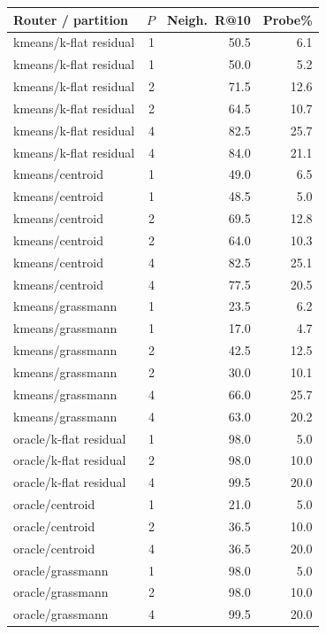 \begin{tabular}{lrrr}
\toprule
Router / partition & $P$ & Neigh.\ R@10 & Probe\% \\
\midrule
kmeans/k-flat residual & 1 & 50.5 & 6.1 \\
kmeans/k-flat residual & 1 & 50.0 & 5.2 \\
kmeans/k-flat residual & 2 & 71.5 & 12.6 \\
kmeans/k-flat residual & 2 & 64.5 & 10.7 \\
kmeans/k-flat residual & 4 & 82.5 & 25.7 \\
kmeans/k-flat residual & 4 & 84.0 & 21.1 \\
kmeans/centroid & 1 & 49.0 & 6.5 \\
kmeans/centroid & 1 & 48.5 & 5.0 \\
kmeans/centroid & 2 & 69.5 & 12.8 \\
kmeans/centroid & 2 & 64.0 & 10.3 \\
kmeans/centroid & 4 & 82.5 & 25.1 \\
kmeans/centroid & 4 & 77.5 & 20.5 \\
kmeans/grassmann & 1 & 23.5 & 6.2 \\
kmeans/grassmann & 1 & 17.0 & 4.7 \\
kmeans/grassmann & 2 & 42.5 & 12.5 \\
kmeans/grassmann & 2 & 30.0 & 10.1 \\
kmeans/grassmann & 4 & 66.0 & 25.7 \\
kmeans/grassmann & 4 & 63.0 & 20.2 \\
oracle/k-flat residual & 1 & 98.0 & 5.0 \\
oracle/k-flat residual & 2 & 98.0 & 10.0 \\
oracle/k-flat residual & 4 & 99.5 & 20.0 \\
oracle/centroid & 1 & 21.0 & 5.0 \\
oracle/centroid & 2 & 36.5 & 10.0 \\
oracle/centroid & 4 & 36.5 & 20.0 \\
oracle/grassmann & 1 & 98.0 & 5.0 \\
oracle/grassmann & 2 & 98.0 & 10.0 \\
oracle/grassmann & 4 & 99.5 & 20.0 \\
\bottomrule
\end{tabular}
